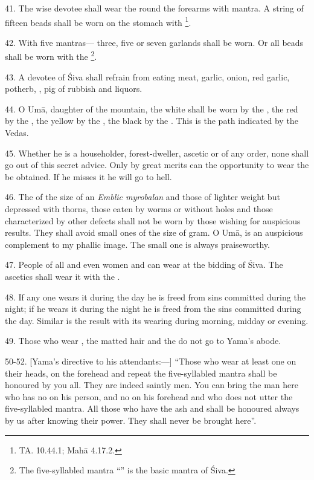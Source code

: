 41. The wise devotee shall wear the  round the forearms with
 mantra. A string of fifteen beads shall be worn on the stomach
with \footnote{TA. 10.44.1; Mahā 4.17.2.}.

42. With five mantras— \etc three, five or seven garlands shall
be worn. Or all beads shall be worn with the \footnote{The
five-syllabled mantra “” is the basic  mantra of Śiva.}.

43. A devotee of Śiva shall refrain from eating meat, garlic, onion, red garlic,
potherb, , pig of rubbish and liquors.

44. O Umā, daughter of the mountain, the white  shall be worn by
the , the red by the , the yellow by the ,
the black by the . This is the path indicated by the Vedas.

45. Whether he is a householder, forest-dweller, ascetic or of any order, none
shall go out of this secret advice. Only by great merits can the opportunity to
wear the  be obtained. If he misses it he will go to hell.

46. The  of the size of an \emph{Emblic myrobalan} and those of
lighter weight but depressed with thorns, those eaten by worms or without holes
and those characterized by other defects shall not be worn by those wishing for
auspicious results. They shall avoid small ones of the size of gram. O Umā,
 is an auspicious complement to my phallic image. The small one is
always praiseworthy.

47. People of all  and  even women and  can
wear  at the bidding of Śiva. The ascetics shall wear it with
the .

48. If any one wears it during the day he is freed from sins committed during
the night; if he wears it during the night he is freed from the sins committed
during the day. Similar is the result with its wearing during morning, midday or
evening.

49. Those who wear , the matted hair and the  do not
go to Yama’s abode.

50-52. [Yama’s directive to his attendants:—] “Those who wear at least one
 on their heads,  on the forehead and repeat the
five-syllabled mantra shall be honoured by you all. They are indeed saintly men.
You can bring the man here who has no  on his person, and no
 on his forehead and who does not utter the five-syllabled mantra.
All those who have the ash and  shall be honoured always by us
after knowing their power. They shall never be brought here”.

